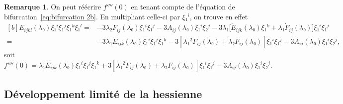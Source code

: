 \documentclass[12pt, final]{amsart}
\theoremstyle{definition}
\newtheorem{remark}{Remarque}
\begin{document}
\begin{remark}
  On peut réécrire \(f''''(0)\) en tenant compte de l'équation de
  bifurcation~\eqref{eq:bifurcation 2b}. En multipliant celle-ci par \(ξ₁^i\),
  on trouve en effet
 \begin{equation*}
   \begin{aligned}[b]
     E_{i j k l}(λ₀) ξ₁^i ξ₁^j ξ₁^k ξ₁^l
     ={} & - 3 λ₂ F_{i j}(λ₀) ξ₁^i ξ₁^j - 3 A_{i j}(λ₀) ξ₁^i ξ₂^j - 3 λ₁ \bigl[\dot{E}_{i j k} (λ₀) ξ₁^k + λ₁ \dot{F}_{i j}(λ₀)\bigr] ξ₁^i ξ₁^j\\
     ={} & - 3 λ₁ \dot{E}_{i j k}(λ₀) ξ₁^i ξ₁^j ξ₁^k - 3 [λ₁^2 \dot{F}_{i j} (λ₀) + λ₂ F_{i j}(λ₀)] ξ₁^i ξ₁^j - 3 A_{i j}(λ₀) ξ₁^i ξ₂^j,
   \end{aligned}
 \end{equation*}
 soit
 \begin{equation}
   f''''(0) = λ₁ \dot{E}_{i j k}(λ₀) ξ₁^i ξ₁^j ξ₁^k + 3 [λ₁^2 \dot{F}_{i j} (λ₀) + λ₂ F_{i j}(λ₀)] ξ₁^i ξ₁^j - 3 A_{i j}(λ₀) ξ₁^i ξ₂^j.
 \end{equation}
\end{remark}

\subsection{Développement limité de la hessienne}\label{sec:DL
hessienne}
\end{document}
